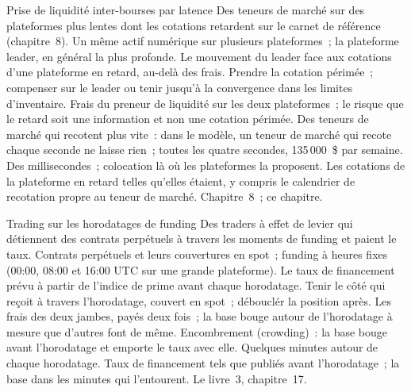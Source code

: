 \begin{strategyfile}{Prise de liquidité inter-bourses par latence}\label{strat:hf:crypto-high-frequency-trading-on-centralised-venues:taking}
 Des teneurs de marché sur des plateformes plus lentes dont les cotations retardent sur le carnet de référence (chapitre~8).
 Un même actif numérique sur plusieurs plateformes~; la plateforme leader, en général la plus profonde.
 Le mouvement du leader face aux cotations d'une plateforme en retard, au-delà des frais.
 Prendre la cotation périmée~; compenser sur le leader ou tenir jusqu'à la convergence dans les limites d'inventaire.
 Frais du preneur de liquidité sur les deux plateformes~; le risque que le retard soit une information et non une cotation périmée.
 Des teneurs de marché qui recotent plus vite~: dans le modèle, un teneur de marché qui recote chaque seconde ne laisse rien~; toutes les quatre secondes, 135\,000~\$ par semaine.
 Des millisecondes~; colocation là où les plateformes la proposent.
 Les cotations de la plateforme en retard telles qu'elles étaient, y compris le calendrier de recotation propre au teneur de marché.
 Chapitre~8~; ce chapitre.
\end{strategyfile}

\begin{strategyfile}{Trading sur les horodatages de funding}\label{strat:hf:crypto-high-frequency-trading-on-centralised-venues:funding}
 Des traders à effet de levier qui détiennent des contrats perpétuels à travers les moments de funding et paient le taux.
 Contrats perpétuels et leurs couvertures en spot~; funding à heures fixes (00:00, 08:00 et 16:00 UTC sur une grande plateforme).
 Le taux de financement prévu à partir de l'indice de prime avant chaque horodatage.
 Tenir le côté qui reçoit à travers l'horodatage, couvert en spot~; débouclér la position après.
 Les frais des deux jambes, payés deux fois~; la base bouge autour de l'horodatage à mesure que d'autres font de même.
 Encombrement (crowding)~: la base bouge avant l'horodatage et emporte le taux avec elle.
 Quelques minutes autour de chaque horodatage.
 Taux de financement tels que publiés avant l'horodatage~; la base dans les minutes qui l'entourent.
 Le livre~3, chapitre~17.
\end{strategyfile}

